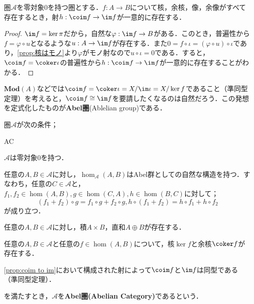\begin{prop}\label{prop:coim to im}
	圏$\mathscr{A}$を零対象$0$を持つ圏とする．$f:A\to B$について核，余核，像，余像がすべて存在するとき，射$h:\coim f\to\im f$が一意的に存在する．
\end{prop}

\begin{proof}
	$\im f=\ker\pi$だから，自然な$\varphi:\im f\to B$がある．このとき，普遍性から$f=\varphi\circ u$となるような$u:A\to\im f$が存在する．また$0=f\circ\iota=(\varphi\circ u)\circ\iota$であり，\ref{prop:核はモノ}より$\varphi$がモノ射なので$u\circ\iota=0$である．すると，$\coim f=\coker\iota$の普遍性から$h:\coim f\to\im f$が一意的に存在することがわかる．
\end{proof}

\begin{figure}[H]
	\centering
	\caption{}
\end{figure}

$\textbf{Mod}(A)$などでは$\coim f=\coker\iota=X/\im\iota=X/\ker f$であること（準同型定理）を考えると，$\coim f\cong\im f$を要請したくなるのは自然だろう．この発想を定式化したものが\textbf{Abel圏}(Ablelian group)である．

\begin{defi}[Abel圏]
	圏$\mathscr{A}$が次の条件；
	\begin{defiterm}{AC}
		\item $\mathscr{A}$は零対象0を持つ．
		\item 任意の$A,B\in\mathscr{A}$に対し，$\hom_{\mathscr{A}}(A,B)$はAbel群としての自然な構造を持つ．すなわち，任意の$C\in\mathscr{A}$と，$f_1,f_2\in\hom(A,B),g\in\hom(C,A),h\in\hom(B,C)$に対して；
		\[(f_1+f_2)\circ g=f_1\circ g+f_2\circ g, h\circ(f_1+f_2)=h\circ f_1+h\circ f_2\]
		が成り立つ．
		\item 任意の$A,B\in\mathscr{A}$に対し，積$A\times B$，直和$A\oplus B$が存在する．
		\item 任意の$A,B\in\mathscr{A}$と任意の$f\in\hom(A,B)$について，核$\ker f$と余核$\coker f$が存在する．
		\item \ref{prop:coim to im}において構成された射によって$\coim f$と$\im f$は同型である（準同型定理）．
	\end{defiterm}
	を満たすとき，$\mathscr{A}$を\textbf{Abel圏(Abelian Category)}であるという．
\end{defi}

